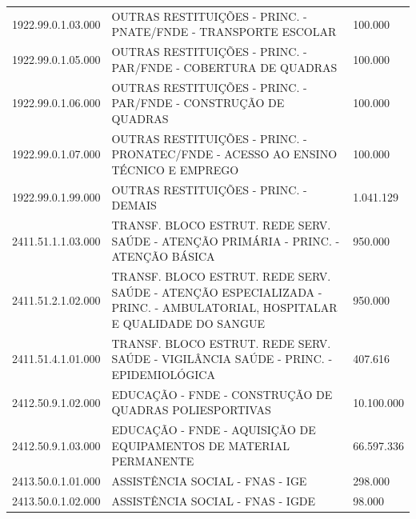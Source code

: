 \documentclass{article}
\begin{document}
\begin{longtable}[c]{m{2cm}|m{13cm}|m{2cm}}
\multicolumn{1}{C{2cm}|}{1922.99.0.1.03.000} & \multicolumn{1}{L{13cm}|}{OUTRAS RESTITUIÇÕES - PRINC. - PNATE/FNDE - TRANSPORTE ESCOLAR} & \multicolumn{1}{R{2cm}}{100.000} \\
\multicolumn{1}{C{2cm}|}{1922.99.0.1.05.000} & \multicolumn{1}{L{13cm}|}{OUTRAS RESTITUIÇÕES - PRINC. - PAR/FNDE - COBERTURA DE QUADRAS} & \multicolumn{1}{R{2cm}}{100.000} \\
\multicolumn{1}{C{2cm}|}{1922.99.0.1.06.000} & \multicolumn{1}{L{13cm}|}{OUTRAS RESTITUIÇÕES - PRINC. - PAR/FNDE - CONSTRUÇÃO DE QUADRAS} & \multicolumn{1}{R{2cm}}{100.000} \\
\multicolumn{1}{C{2cm}|}{1922.99.0.1.07.000} & \multicolumn{1}{L{13cm}|}{OUTRAS RESTITUIÇÕES - PRINC. - PRONATEC/FNDE - ACESSO AO ENSINO TÉCNICO E EMPREGO} & \multicolumn{1}{R{2cm}}{100.000} \\
\multicolumn{1}{C{2cm}|}{1922.99.0.1.99.000} & \multicolumn{1}{L{13cm}|}{OUTRAS RESTITUIÇÕES - PRINC. - DEMAIS} & \multicolumn{1}{R{2cm}}{1.041.129} \\
\multicolumn{1}{C{2cm}|}{2411.51.1.1.03.000} & \multicolumn{1}{L{13cm}|}{TRANSF. BLOCO ESTRUT. REDE SERV. SAÚDE - ATENÇÃO PRIMÁRIA - PRINC. - ATENÇÃO BÁSICA} & \multicolumn{1}{R{2cm}}{950.000} \\
\multicolumn{1}{C{2cm}|}{2411.51.2.1.02.000} & \multicolumn{1}{L{13cm}|}{TRANSF. BLOCO ESTRUT. REDE SERV. SAÚDE - ATENÇÃO ESPECIALIZADA - PRINC. - AMBULATORIAL, HOSPITALAR E QUALIDADE DO SANGUE} & \multicolumn{1}{R{2cm}}{950.000} \\
\multicolumn{1}{C{2cm}|}{2411.51.4.1.01.000} & \multicolumn{1}{L{13cm}|}{TRANSF. BLOCO ESTRUT. REDE SERV. SAÚDE - VIGILÂNCIA SAÚDE - PRINC. - EPIDEMIOLÓGICA} & \multicolumn{1}{R{2cm}}{407.616} \\
\multicolumn{1}{C{2cm}|}{2412.50.9.1.02.000} & \multicolumn{1}{L{13cm}|}{EDUCAÇÃO - FNDE - CONSTRUÇÃO DE QUADRAS POLIESPORTIVAS} & \multicolumn{1}{R{2cm}}{10.100.000} \\
\multicolumn{1}{C{2cm}|}{2412.50.9.1.03.000} & \multicolumn{1}{L{13cm}|}{EDUCAÇÃO - FNDE - AQUISIÇÃO DE EQUIPAMENTOS DE MATERIAL PERMANENTE} & \multicolumn{1}{R{2cm}}{66.597.336} \\
\multicolumn{1}{C{2cm}|}{2413.50.0.1.01.000} & \multicolumn{1}{L{13cm}|}{ASSISTÊNCIA SOCIAL - FNAS - IGE} & \multicolumn{1}{R{2cm}}{298.000} \\
\multicolumn{1}{C{2cm}|}{2413.50.0.1.02.000} & \multicolumn{1}{L{13cm}|}{ASSISTÊNCIA SOCIAL - FNAS - IGDE} & \multicolumn{1}{R{2cm}}{98.000} \\

\end{longtable}
\end{document}

